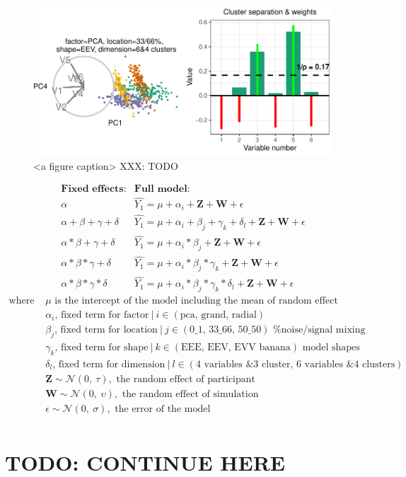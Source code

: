 \documentclass{monashthesis}
\begin{document}
\begin{figure}

{\centering \includegraphics[width=1\linewidth,]{./figures_from_script/ch4_fig3_accuracy_measure} 

}

\caption{<a figure caption> XXX: TODO}\label{fig:ch4fig3}
\end{figure}

\[
\begin{array}{ll}
\textbf{Fixed effects:}          &\textbf{Full model:} \\
\alpha                           &\widehat{Y_1} = \mu + \alpha_i + \textbf{Z} + \textbf{W} + \epsilon \\
\alpha + \beta + \gamma + \delta &\widehat{Y_1} = \mu + \alpha_i + \beta_j + \gamma_k + \delta_l + \textbf{Z} + \textbf{W} + \epsilon \\
\alpha * \beta + \gamma + \delta &\widehat{Y_1} = \mu + \alpha_i * \beta_j + \textbf{Z} + \textbf{W} + \epsilon \\
\alpha * \beta * \gamma + \delta &\widehat{Y_1} = \mu + \alpha_i * \beta_j * \gamma_k + \textbf{Z} + \textbf{W} + \epsilon \\
\alpha * \beta * \gamma * \delta &\widehat{Y_1} = \mu + \alpha_i * \beta_j * \gamma_k * \delta_l + \textbf{Z} + \textbf{W} + \epsilon
\end{array}
\]
\[
\begin{array}{ll}
\text{where } &\mu \text{ is the intercept of the model including the mean of random effect} \\
&\alpha_i \text{, fixed term for factor}~|~i\in (\text{pca, grand, radial}) \\
&\beta_j  \text{, fixed term for location}~|~j\in (\text{0\_1, 33\_66, 50\_50}) \text{ \% noise/signal mixing} \\
&\gamma_k \text{, fixed term for shape}~|~k\in (\text{EEE, EEV, EVV banana}) \text{ model shapes} \\
&\delta_l \text{, fixed term for dimension}~|~l\in (\text{4 variables \& 3 cluster, 6 variables \& 4 clusters}) \\
&\textbf{Z} \sim \mathcal{N}(0,~\tau), \text{ the random effect of participant} \\
&\textbf{W} \sim \mathcal{N}(0,~\upsilon), \text{ the random effect of simulation} \\
&\epsilon   \sim \mathcal{N}(0,~\sigma), \text{ the error of the model} \\
\end{array}
\]

\hypertarget{todo-continue-here}{%
\section{TODO: CONTINUE HERE}\label{todo-continue-here}}

\printbibliography[heading=bibintoc]
\end{document}
